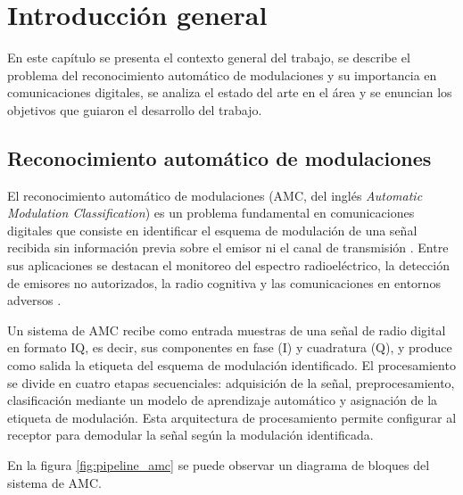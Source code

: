 
\chapter{Introducción general}

\label{Chapter1}

En este capítulo se presenta el contexto general del trabajo, se describe el problema del reconocimiento automático de modulaciones y su importancia en comunicaciones digitales, se analiza el estado del arte en el área y se enuncian los objetivos que guiaron el desarrollo del trabajo.


\section{Reconocimiento automático de modulaciones}

El reconocimiento automático de modulaciones (AMC, del inglés \textit{Automatic Modulation Classification}) es un problema fundamental en comunicaciones digitales que consiste en identificar el esquema de modulación de una señal recibida sin información previa sobre el emisor ni el canal de transmisión \cite{zhu2015automatic}.
Entre sus aplicaciones se destacan el monitoreo del espectro radioeléctrico, la detección de emisores no autorizados, la radio cognitiva y las comunicaciones en entornos adversos \cite{dobre2007survey}.

Un sistema de AMC recibe como entrada muestras de una señal de radio digital en formato IQ, es decir, sus componentes en fase (I) y cuadratura (Q), y produce como salida la etiqueta del esquema de modulación identificado. El procesamiento se divide en cuatro etapas secuenciales: adquisición de la señal, preprocesamiento, clasificación mediante un modelo de aprendizaje automático y asignación de la etiqueta de modulación. Esta arquitectura de procesamiento permite configurar al receptor para demodular la señal según la modulación identificada.

En la figura \ref{fig:pipeline_amc} se puede observar un diagrama de bloques del sistema de AMC.

